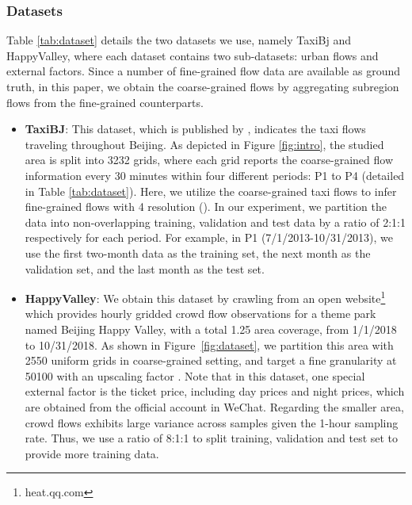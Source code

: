 \subsubsection{Datasets}
Table \ref{tab:dataset} details the two datasets we use, namely TaxiBj and HappyValley, where each dataset contains two sub-datasets: urban flows and external factors. Since a number of fine-grained flow data are available as ground truth, in this paper, we obtain the coarse-grained flows by aggregating subregion flows from the fine-grained counterparts.
\begin{itemize}[leftmargin=*]
	\item \textbf{TaxiBJ}: This dataset, which is published by \citeauthor{zhang2017deep} \cite{zhang2017deep}, indicates the taxi flows traveling throughout Beijing. As depicted in Figure \ref{fig:intro}, the studied area is split into 3232 grids, where each grid reports the coarse-grained flow information every 30 minutes within four different periods: P1 to P4 (detailed in Table \ref{tab:dataset}). Here, we utilize the coarse-grained taxi flows to infer fine-grained flows with 4 resolution (). In our experiment, we partition the data into non-overlapping training, validation and test data by a ratio of 2:1:1 respectively for each period. For example, in P1 (7/1/2013-10/31/2013), we use the first two-month data as the training set, the next month as the validation set, and the last month as the test set.
	\item \textbf{HappyValley}: We obtain this dataset by crawling from an open website\footnote{heat.qq.com} which provides hourly gridded crowd flow observations for a theme park named Beijing Happy Valley, with a total 1.25 area coverage, from 1/1/2018 to 10/31/2018. As shown in Figure~\ref{fig:dataset}, we partition this area with 2550 uniform grids in coarse-grained setting, and target a fine granularity at 50100 with an upscaling factor . Note that in this dataset, one special external factor is the ticket price, including day prices and night prices, which are obtained from the official account in WeChat. Regarding the smaller area, crowd flows exhibits large variance across samples given the 1-hour sampling rate. Thus, we use a ratio of 8:1:1 to split training, validation and test set to provide more training data.
\end{itemize}
